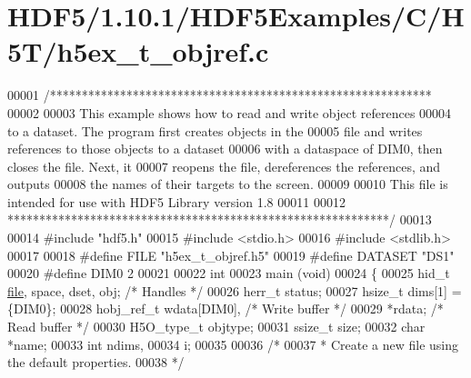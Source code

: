 \hypertarget{_h_d_f5_21_810_81_2_h_d_f5_examples_2_c_2_h5_t_2h5ex__t__objref_8c_source}{}\section{H\+D\+F5/1.10.1/\+H\+D\+F5\+Examples/\+C/\+H5\+T/h5ex\+\_\+t\+\_\+objref.c}
\label{_h_d_f5_21_810_81_2_h_d_f5_examples_2_c_2_h5_t_2h5ex__t__objref_8c_source}

\begin{DoxyCode}
00001 \textcolor{comment}{/************************************************************}
00002 \textcolor{comment}{}
00003 \textcolor{comment}{  This example shows how to read and write object references}
00004 \textcolor{comment}{  to a dataset.  The program first creates objects in the}
00005 \textcolor{comment}{  file and writes references to those objects to a dataset}
00006 \textcolor{comment}{  with a dataspace of DIM0, then closes the file.  Next, it}
00007 \textcolor{comment}{  reopens the file, dereferences the references, and outputs}
00008 \textcolor{comment}{  the names of their targets to the screen.}
00009 \textcolor{comment}{}
00010 \textcolor{comment}{  This file is intended for use with HDF5 Library version 1.8}
00011 \textcolor{comment}{}
00012 \textcolor{comment}{ ************************************************************/}
00013 
00014 \textcolor{preprocessor}{#include "hdf5.h"}
00015 \textcolor{preprocessor}{#include <stdio.h>}
00016 \textcolor{preprocessor}{#include <stdlib.h>}
00017 
00018 \textcolor{preprocessor}{#define FILE            "h5ex\_t\_objref.h5"}
00019 \textcolor{preprocessor}{#define DATASET         "DS1"}
00020 \textcolor{preprocessor}{#define DIM0            2}
00021 
00022 \textcolor{keywordtype}{int}
00023 main (\textcolor{keywordtype}{void})
00024 \{
00025     hid\_t       \hyperlink{structfile}{file}, space, dset, obj;     \textcolor{comment}{/* Handles */}
00026     herr\_t      status;
00027     hsize\_t     dims[1] = \{DIM0\};
00028     hobj\_ref\_t  wdata[DIM0],                \textcolor{comment}{/* Write buffer */}
00029                 *rdata;                     \textcolor{comment}{/* Read buffer */}
00030     H5O\_type\_t  objtype;
00031     ssize\_t     size;
00032     \textcolor{keywordtype}{char}        *name;
00033     \textcolor{keywordtype}{int}         ndims,
00034                 i;
00035 
00036     \textcolor{comment}{/*}
00037 \textcolor{comment}{     * Create a new file using the default properties.}
00038 \textcolor{comment}{     */}

\end{DoxyCode}

